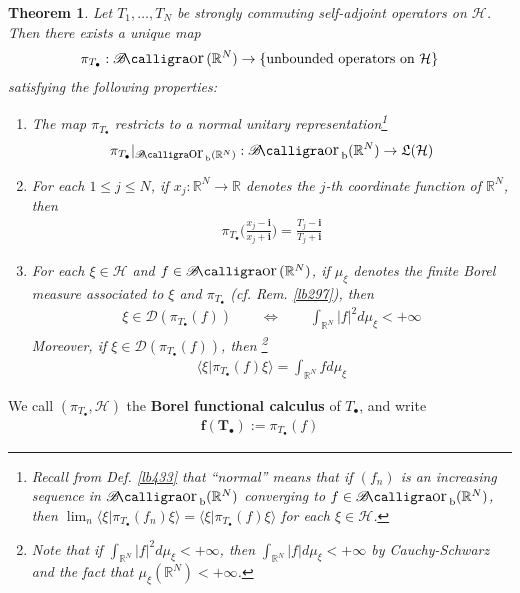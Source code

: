 \documentclass[12pt,b5paper,notitlepage]{article}
\theoremstyle{definition}
\theoremstyle{plain}
\newtheorem{thm}[df]{Theorem}
\DeclareMathOperator{\Bor}{\mathscr{B}\text{\kern -2pt {\calligra\large or}}\,}
\DeclareMathOperator{\Borb}{{\mathscr{B}\text{\kern -2pt {\calligra\large or}}\,}_{\mathrm b}}
\newcommand{\fk}{\mathfrak}
\newcommand{\Dom}{\mathscr{D}}
\newcommand{\bk}[1]{\langle {#1}\rangle}
\newcommand{\im}{\mathbf{i}}
\newcommand{\blt}{\bullet}
\newcommand{\Rbb}{\mathbb R}
\newcommand{\MH}{\mathcal H}
\numberwithin{equation}{section}
\begin{document}
\begin{thm}\label{lb434}
Let $T_1,\dots,T_N$ be strongly commuting self-adjoint operators on $\MH$. Then there exists a unique map
\begin{align*}
\pi_{T_\blt}:\Bor(\Rbb^N)\rightarrow\{\text{unbounded operators on }\MH\}
\end{align*}
satisfying the following properties:
\begin{enumerate}[label=(\arabic*)]
\item The map $\pi_{T_\blt}$ restricts to a normal unitary representation\footnote{Recall from Def. \ref{lb433} that ``normal'' means that if $(f_n)$ is an increasing sequence in $\Borb(\Rbb^N)$ converging to $f\in\Borb(\Rbb^N)$, then $\lim_n\bk{\xi|\pi_{T_\blt}(f_n)\xi}=\bk{\xi|\pi_{T_\blt}(f)\xi}$ for each $\xi\in\MH$.}
\begin{align*}
\pi_{T_\blt}|_{\Borb(\Rbb^N)}:\Borb(\Rbb^N)\rightarrow\fk L(\MH)
\end{align*}
\item For each $1\leq j\leq N$, if $x_j:\Rbb^N\rightarrow\Rbb$ denotes the $j$-th coordinate function of $\Rbb^N$, then
\begin{align*}
\pi_{T_\blt}\Big(\frac{x_j-\im}{x_j+\im}\Big)=\frac{T_j-\im}{T_j+\im}
\end{align*}
\item For each $\xi\in\MH$ and $f\in\Bor(\Rbb^N)$, if $\mu_\xi$ denotes the finite Borel measure associated to $\xi$ and $\pi_{T_\blt}$ (cf. Rem. \ref{lb297}), then
\begin{align}
\xi\in\Dom(\pi_{T_\blt}(f))\qquad\Longleftrightarrow\qquad \int_{\Rbb^N} |f|^2d\mu_\xi<+\infty
\end{align}
Moreover, if $\xi\in\Dom(\pi_{T_\blt}(f))$, then \footnote{Note that if $\int_{\Rbb^N} |f|^2d\mu_\xi<+\infty$, then $\int_{\Rbb^N} |f|d\mu_\xi<+\infty$ by Cauchy-Schwarz and the fact that $\mu_\xi(\Rbb^N)<+\infty$.}
\begin{align}
\bk{\xi|\pi_{T_\blt}(f)\xi}=\int_{\Rbb^N}fd\mu_\xi
\end{align}
\end{enumerate}
\end{thm}


We call $(\pi_{T_\blt},\MH)$ the \textbf{Borel functional calculus}  of $T_\blt$, and write
\begin{align*}
\pmb{f(T_\blt)}:=\pi_{T_\blt}(f)
\end{align*}
\end{document}
